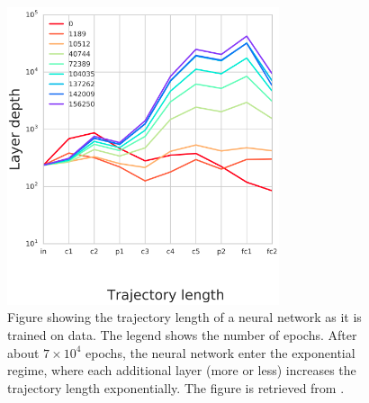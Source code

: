 \begin{figure}[H]
    \centering
    \includegraphics[width=8cm]{latex/figures/trajectory_train.PNG}
    \caption{Figure showing the trajectory length of a neural network as it is trained on data. The legend shows the number of epochs. After about $7\times 10^4$ epochs, the neural network enter the exponential regime, where each additional layer (more or less) increases the trajectory length exponentially. The figure is retrieved from \citet{raghu2017expressive}.}
\label{fig:trajectory_trained}
\end{figure}

